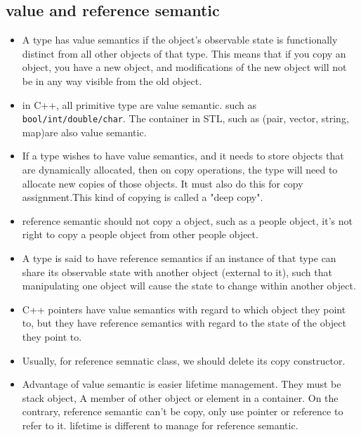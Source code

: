 \documentclass[a4paper,11pt,twoside]{book}
\begin{document}
\subsection{value and reference semantic}
\begin{itemize}
	\item A type has value semantics if the object's observable state is functionally distinct from all other objects of that type. This means that if you copy an object, you have a new object, and modifications of the new object will not be in any way visible from the old object.
	
	\item in C++, all primitive type are value semantic. such as \texttt{bool/int/double/char}. The container in STL, such as (pair, vector, string, map)are also value semantic.
	
	\item If a type wishes to have value semantics, and it needs to store objects that are dynamically allocated, then on copy operations, the type will need to allocate new copies of those objects. It must also do this for copy assignment.This kind of copying is called a "deep copy".
	
	\item reference semantic should not copy a object, such as a people object, it's not right to copy a people object from other people object. 
	
	\item A type is said to have reference semantics if an instance of that type can share its observable state with another object (external to it), such that manipulating one object will cause the state to change within another object.
	
	\item C++ pointers have value semantics with regard to which object they point to, but they have reference semantics with regard to the state of the object they point to.
	
	\item Usually, for reference semnatic class, we should delete its copy constructor. 
	

	
	\item Advantage of value semantic is easier lifetime management. They must be stack object, A member of other object or element in a container. On the contrary, reference semantic can't be copy, only use pointer or reference to refer to it. lifetime is different to manage for reference semantic. 
	

\end{itemize}
\end{document}
